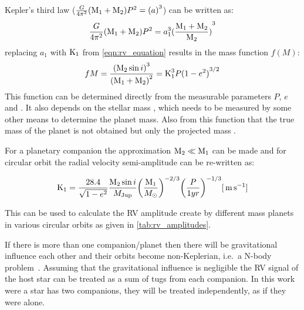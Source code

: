 Kepler's third law (\(\frac{G}{4\pi^{2}}(\textrm{M}_{1} + \textrm{M}_{2})P^{2} = {(a)}^{3}\)) can be written as:
\begin{equation}
    \frac{G}{4\pi^{2}}(\textrm{M}_{1} + \textrm{M}_{2})P^{2} = a_{1}^{3}{(\frac{\textrm{M}_{1} + \textrm{M}_{2}}{\textrm{M}_{2}})}^{3}
\end{equation}
replacing $a_{1}$ with $\textrm{K}_{1}$ from \cref{eqn:rv_equation} results in the mass function $f(M)$:
\begin{equation}
    f{M} = \frac{{(\textrm{M}_{2}\sin{i})}^{3}}{{(\textrm{M}_{1} + \textrm{M}_{2})}^{2}} = \textrm{K}_{1}^{3} P {(1 - {e}^{2})}^{3/2} \label{eqn:mass_function}
\end{equation}
This function can be determined directly from the measurable parameters $P$, $e$ and \Kone{}.
It also depends on the stellar mass \Mone{}, which needs to be measured by some other means to determine the planet mass.
Also from this function that the true mass of the planet \Mtwo{} is not obtained but only the projected mass \Mtwosini{}.

For a planetary companion the approximation $\textrm{M}_{2} \ll \textrm{M}_{1}$ can be made and for circular orbit the radial velocity semi-amplitude can be re-written as:

\begin{equation}
    \textrm{K}_{1} = \frac{28.4}{\sqrt{1 - {e}^{2}}} \frac{\textrm{M}_{2}\sin{i}}{M_{\mathrm{Jup}}} {\left(\frac{\textrm{M}_{1}}{M_{\odot}}\right)}^{-2/3} {\left(\frac{P}{1 yr}\right)}^{-1/3}  [\,\si{\meter\per\second}] \label{eqn:k_relation}
\end{equation}

This can be used to calculate the RV amplitude create by different mass planets in various circular orbits as given in \cref{tab:rv_amplitudes}.

If there is more than one companion/planet then there will be gravitational influence each other and their orbits become non-Keplerian, i.e.\ a N-body problem~\citep[e.g.][]{chenciner_three_2007}.
Assuming that the gravitational influence is negligible the RV signal of the host star can be treated as a sum of tugs from each companion.
In this work were a star has two companions, they will be treated independently, as if they were alone.


